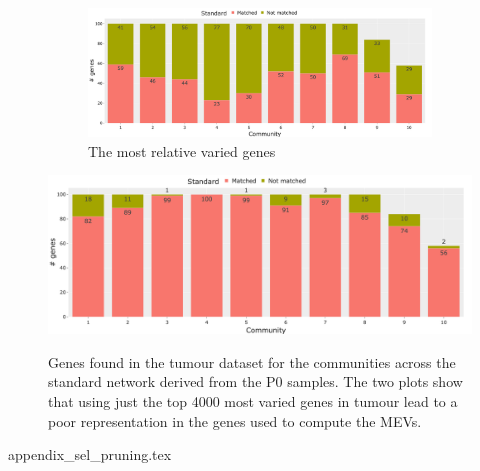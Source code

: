 \begin{figure}[H]
    \centering
    \begin{subfigure}[b]{1.0\textwidth}
        \includegraphics[width=\textwidth,keepaspectratio]{Sections/Network_I/Resources/P0/4K_p0_modConMev_rep_standard_4K_50TF_v3.png}
        \caption{The most relative varied genes}
        \label{fig:ap:std_p0_mev_sel_rep}
    \end{subfigure}
    \includegraphics[width=\textwidth,keepaspectratio]{Sections/Network_I/Resources/P0/13K_p0_modConMev_rep_standard_4K_50TF_v3.png}
    \label{fig:ap:std_p0_mev_all_rep}
    \caption{Genes found in the tumour dataset for the communities across the standard network derived from the P0 samples. The two plots show that using just the top 4000 most varied genes in tumour lead to a poor representation in the genes used to compute the MEVs.}
    \label{fig:ap:std_p0_mev_rep}
\end{figure}


\newpage 


{appendix_sel_pruning.tex}

